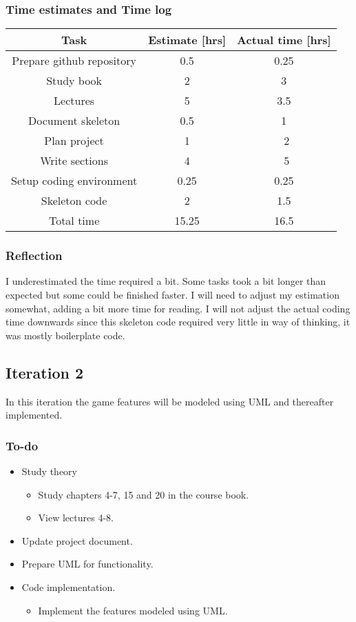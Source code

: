 \documentclass[12pt, letterpaper]{article}
\begin{document}
\subsubsection{Time estimates and Time log}
\begin{center}
	\begin{tabular}{|c|c|c|} 
		\hline
		Task & Estimate [hrs] & Actual time [hrs] \\ [0.5ex] 
		\hline\hline
		Prepare github repository & 0.5 & 0.25\\
		\hline 
		Study book & 2 & 3 \\
		\hline
		Lectures & 5 & 3.5 \\
		\hline 
		Document skeleton & 0.5 & 1 \\
		\hline 
		Plan project & 1 & ~2\\
		\hline
		Write sections & 4 & ~5\\
		\hline 
		Setup coding environment & 0.25 & 0.25\\
		\hline 
		Skeleton code & 2 & 1.5 \\ 
		\hline
		Total time & 15.25 & 16.5\\ [1ex]
		\hline 
	\end{tabular}
\end{center}
\subsubsection{Reflection}
I underestimated the time required a bit. Some tasks took a bit longer than expected but some could be finished faster. I will need to adjust my estimation somewhat, adding a bit more time for reading. I will not adjust the actual coding time downwards since this skeleton code required very little in way of thinking, it was mostly boilerplate code.

\subsection{Iteration 2}
In this iteration the game features will be modeled using UML and thereafter implemented.
\subsubsection{To-do}
\begin{itemize}
	\item Study theory
	\begin{itemize}
		\item Study chapters 4-7, 15 and 20 in the course book.
		\item View lectures 4-8.
	\end{itemize}
	\item Update project document.
	\item Prepare UML for functionality.
	\item Code implementation.
	\begin{itemize}
		\item Implement the features modeled using UML.
	\end{itemize}
\end{itemize}
\end{document}
